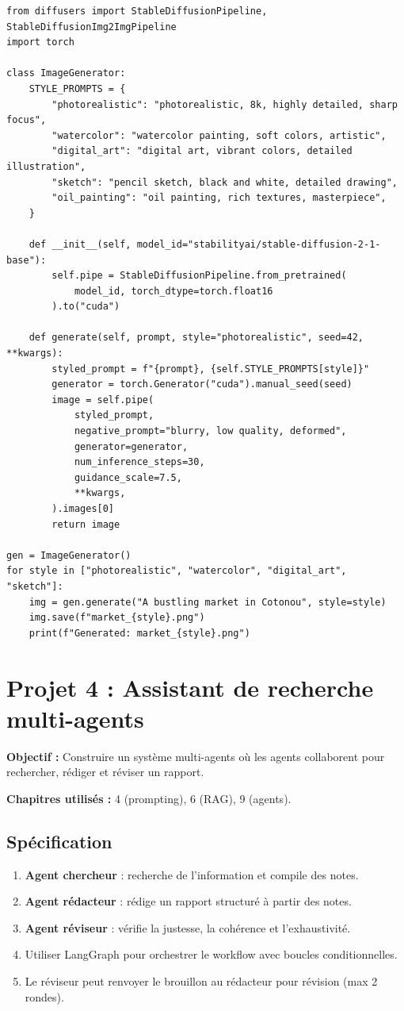\begin{verbatim}
from diffusers import StableDiffusionPipeline, StableDiffusionImg2ImgPipeline
import torch

class ImageGenerator:
    STYLE_PROMPTS = {
        "photorealistic": "photorealistic, 8k, highly detailed, sharp focus",
        "watercolor": "watercolor painting, soft colors, artistic",
        "digital_art": "digital art, vibrant colors, detailed illustration",
        "sketch": "pencil sketch, black and white, detailed drawing",
        "oil_painting": "oil painting, rich textures, masterpiece",
    }

    def __init__(self, model_id="stabilityai/stable-diffusion-2-1-base"):
        self.pipe = StableDiffusionPipeline.from_pretrained(
            model_id, torch_dtype=torch.float16
        ).to("cuda")

    def generate(self, prompt, style="photorealistic", seed=42, **kwargs):
        styled_prompt = f"{prompt}, {self.STYLE_PROMPTS[style]}"
        generator = torch.Generator("cuda").manual_seed(seed)
        image = self.pipe(
            styled_prompt,
            negative_prompt="blurry, low quality, deformed",
            generator=generator,
            num_inference_steps=30,
            guidance_scale=7.5,
            **kwargs,
        ).images[0]
        return image

gen = ImageGenerator()
for style in ["photorealistic", "watercolor", "digital_art", "sketch"]:
    img = gen.generate("A bustling market in Cotonou", style=style)
    img.save(f"market_{style}.png")
    print(f"Generated: market_{style}.png")
\end{verbatim}

\section{Projet 4 : Assistant de recherche multi-agents}

\textbf{Objectif :} Construire un syst\`eme multi-agents o\`u les agents collaborent pour rechercher, r\'ediger et r\'eviser un rapport.

\textbf{Chapitres utilis\'es :} 4 (prompting), 6 (RAG), 9 (agents).

\subsection{Sp\'ecification}

\begin{enumerate}
  \item \textbf{Agent chercheur} : recherche de l'information et compile des notes.
  \item \textbf{Agent r\'edacteur} : r\'edige un rapport structur\'e \`a partir des notes.
  \item \textbf{Agent r\'eviseur} : v\'erifie la justesse, la coh\'erence et l'exhaustivit\'e.
  \item Utiliser LangGraph pour orchestrer le workflow avec boucles conditionnelles.
  \item Le r\'eviseur peut renvoyer le brouillon au r\'edacteur pour r\'evision (max 2 rondes).
\end{enumerate}

